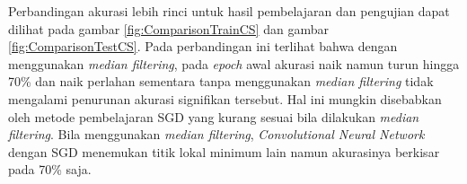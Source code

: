\noindent Perbandingan akurasi lebih rinci untuk hasil pembelajaran dan pengujian dapat dilihat pada gambar \ref{fig:ComparisonTrainCS} dan gambar \ref{fig:ComparisonTestCS}. Pada perbandingan ini terlihat bahwa dengan menggunakan \textit{median filtering}, pada \textit{epoch} awal akurasi naik namun turun hingga 70\% dan naik perlahan sementara tanpa menggunakan \textit{median filtering} tidak mengalami penurunan akurasi signifikan tersebut. Hal ini mungkin disebabkan oleh metode pembelajaran SGD yang kurang sesuai bila dilakukan \textit{median filtering}. Bila menggunakan \textit{median filtering}, \textit{Convolutional Neural Network} dengan SGD menemukan titik lokal minimum lain namun akurasinya berkisar pada 70\% saja.\\

\begin{adjustbox}{width=1\textwidth}
\noindent\begin{minipage}{\linewidth}
	\label{fig:ComparisonTrainCS}
\end{minipage}
\end{adjustbox}

\begin{adjustbox}{width=1\textwidth}
\noindent\begin{minipage}{\linewidth}
	\label{fig:ComparisonTestCS}
\end{minipage}
\end{adjustbox}\\

